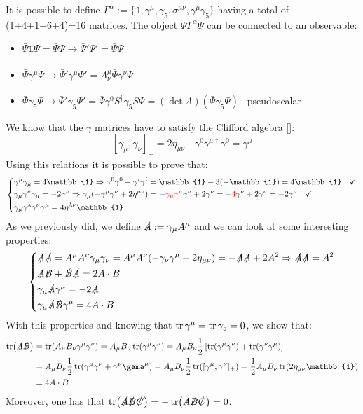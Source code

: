 \documentclass[../main.tex]{subfiles}
\begin{document}
It is possible to define $\Gamma^\alpha:=\{\mathbb{1},\gamma^\mu,\gamma_5,\sigma^{\mu\nu},\gamma^\mu\gamma_5\}$ having a total of (1+4+1+6+4)=16 matrices. The object $\bar{\Psi}\Gamma^\alpha\Psi$ can be connected to an observable:
\begin{itemize}
    \item $\bar{\Psi}\mathbb{1}\Psi=\bar{\Psi}\Psi\xrightarrow[]{}\bar{\Psi}'\Psi'=\bar{\Psi}\Psi$
    \item $\bar{\Psi}\gamma^\mu\Psi\xrightarrow[]{}\bar{\Psi}'\gamma^\mu\Psi'=\Lambda^\mu_\nu\bar{\Psi}\gamma^\nu\Psi$
    \item $\bar{\Psi}\gamma_5\Psi\xrightarrow[]{}\bar{\Psi}'\gamma_5\Psi'=\bar{\Psi}\gamma^0S^\dagger\gamma_5S\Psi=(\det\Lambda)(\bar{\Psi}\gamma_5\Psi)$ \,  pseudoscalar
\end{itemize}
We know that the $\gamma$ matrices have to satisfy the Clifford algebra []:
\[
[\gamma_\mu,\gamma_\nu]_+=2\eta_{\mu\nu} \quad \gamma^0\gamma^{\mu\dagger}\gamma^0=\gamma^\mu
\]
Using this relations it is possible to prove that:
\[
\left\{
\begin{aligned}
&\gamma^\mu\gamma_\mu=4\mathbb{1}\Rightarrow\gamma^0\gamma^0-\gamma^i\gamma^i=\mathbb{1}-3(-\mathbb{1})=4\mathbb{1} \quad \checkmark\\
&\gamma_\mu\gamma^\nu\gamma_\mu=-2\gamma^\nu\Rightarrow\gamma_\mu(-\gamma^\mu\gamma^\nu+2\eta^{\mu\nu})=-{\color{red}\gamma_\mu\gamma^\mu}\gamma^\nu+2\gamma^\nu=-{\color{red}4}\gamma^\nu+2\gamma^\nu=-2\gamma^\nu \quad \checkmark\\
&\gamma_\mu\gamma^\lambda\gamma^\nu\gamma^\mu=4\eta^{\lambda\nu}\mathbb{1}
\end{aligned}
\right.
\]
As we previously did, we define $\slashed{A}:=\gamma_\mu A^\mu$ and we can look at some interesting properties:
\[
\left\{
\begin{aligned}
&\slashed{A}\slashed{A}=A^\mu A^\nu\gamma_\mu\gamma_\nu=A^\mu A^\nu(-\gamma_\nu\gamma^\mu+2\eta_{\mu\nu})=-\slashed{A}\slashed{A}+2A^2\Rightarrow\slashed{A}\slashed{A}=A^2\\
&\slashed{A}\slashed{B}+\slashed{B}\slashed{A}=2A\cdot B\\
&\gamma_\mu\slashed{A}\gamma^\mu=-2\slashed{A}\\
&\gamma_\mu\slashed{A}\slashed{B}\gamma^\mu=4A\cdot B
\end{aligned}
\right.
\]
With this properties and knowing that $\tr\gamma^\mu=\tr\gamma_5=0$, we show that:
\begin{align*}
\tr(\slashed{A}\slashed{B})&=\tr(A_\mu B_\nu\gamma^\mu\gamma^\nu)=A_\mu B_\nu\tr(\gamma^\mu\gamma^\nu)=A_\mu B_\nu\frac{1}{2}\left[\tr(\gamma^\mu\gamma^\nu)+\tr(\gamma^\nu\gamma^\mu)\right]\\
&=A_\mu B_\nu\frac{1}{2}\tr(\gamma^\mu\gamma^\nu+\gamma^\nu\gama^\mu)=A_\mu B_\nu\frac{1}{2}\tr([\gamma^\mu,\gamma^\nu]_+)=\frac{1}{2}A_\mu B_\nu\tr(2\eta_{\mu\nu}\mathbb{1})\\
&=4A\cdot B
\end{align*}
Moreover, one has that $\tr(\slashed{A}\slashed{B}\slashed{C})=-\tr(\slashed{A}\slashed{B}\slashed{C})=0$.
\end{document}
